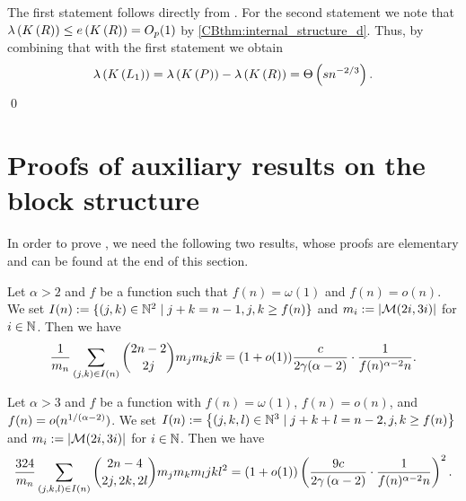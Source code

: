 The first statement follows directly from . For the second statement we note that $\lambda\left(K\left(R\right)\right)\leq e\left({K\left(R\right)}\right)=O_p(1)$ by \ref{CBthm:internal_structure_d}. Thus, by combining that with the first statement we obtain \whp \[\lambda\left(K\left(L_1\right)\right)=\lambda\left(K\left(P\right)\right)-\lambda\left(K\left(R\right)\right)=\Theta\left(sn^{-2/3}\right).\]
\qed
 
\section{Proofs of auxiliary results on the block structure}\label{CBsec:proofs_aux4}
In order to prove , we need the following two results, whose proofs are elementary and can be found at the end of this section.

\begin{claim}\label{CBlem:sum1}	
	Let $\alpha>2$ and $f$ be a function such that $f(n)=\omega(1)$ and $f(n)=o\left(n\right)$. 
	We set $I(n):=\{(j,k)\in \mathbb{N}^2 \mid j+k=n-1, j,k \geq f(n) \}$ and $m_i:=\left|\mathcal{M}(2i,3i)\right|$ for $i\in \mathbb{N}$. Then we have 
\begin{align*}
\frac{1}{m_n}\sum_{(j,k)\in I(n)}\binom{2n-2}{2j}m_jm_k j k=(1+o(1))\frac{c}{2\gamma(\alpha-2)}\cdot\frac{1}{f(n)^{\alpha-2}n}.
\end{align*}
\end{claim}

\begin{claim}\label{CBlem:sum2}
	Let $\alpha>3$ and $f$ be a function with $f(n)=\omega(1)$, $f(n)=o(n)$, and $f(n)=o(n^{1/(\alpha-2)})$. We set $I(n):=\left\{\left(j,k,l\right) \in \mathbb{N}^3 \mid j+k+l=n-2, j,k\geq f(n)\right\}$ and $m_i:=\left|\mathcal{M}(2i,3i)\right|$ for $i \in \mathbb{N}$. Then we have
		\begin{align*}
\frac{324}{m_n}\sum_{(j,k,l)\in I(n)}\binom{2n-4}{2j,2k,2l}m_jm_km_lj k l^2= (1+o(1))\left(\frac{9c}{2\gamma\left(\alpha-2\right)}\cdot \frac{1}{f(n)^{\alpha-2}n}\right)^2.
	\end{align*}
\end{claim}


